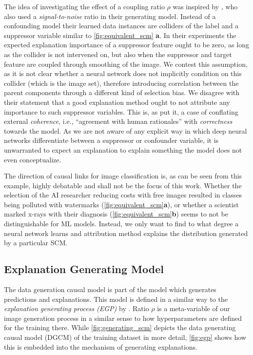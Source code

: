 The idea of investigating the effect of a coupling ratio $\rho$ was inspired by \citet{Clark2023}, who also used a \textit{signal-to-noise} ratio in their generating model. Instead of a confounding model their learned data instances are colliders of the label and a suppressor variable similar to \cref{fig:equivalent_scm} \textbf{a}. In their experiments the expected explanation importance of a suppressor feature ought to be zero, as long as the collider is not intervened on, but also when the suppressor and target feature are coupled through smoothing of the image. We contest this assumption, as it is not clear whether a neural network does not implicitly condition on this collider (which is the image set), therefore introducing correlation between the parent components through a different kind of selection bias. We disagree with their statement that a good explanation method ought to not attribute any importance to such suppressor variables. This is, as  \citet{Nauta2023} put it, a case of conflating external \textit{coherence}, i.e., ``agreement with human rationales'' \citep{Atanasova2020} with \textit{correctness} towards the model. As we are not aware of any explicit way in which deep neural networks differentiate between a suppressor or confounder variable, it is unwarranted to expect an explanation to explain something the model does not even conceptualize. 

The direction of causal links for image classification is, as can be seen from this example, highly debatable and shall not be the focus of this work. Whether the selection of the AI researcher reducing costs with free images resulted in classes being polluted with watermarks (\cref{fig:equivalent_scm}\textbf{a}), or whether a scientist marked x-rays with their diagnosis (\cref{fig:equivalent_scm}\textbf{b}) seems to not be distinguishable for ML models. 
Instead, we only want to find to what degree a neural network learns and attribution method explains the distribution generated by a particular SCM.

\subsection{Explanation Generating Model}
The data generation causal model is part of the model which generates predictions and explanations.
This model is defined in a similar way to the \textit{explanation generating process (EGP)} by \citet{Karimi2023}.
Ratio $\rho$ is a meta-variable of our image generation process in a similar sense to how hyperparameters are defined for the training there. While \cref{fig:generating_scm} depicts the data generating causal model (DGCM) of the training dataset in more detail, \cref{fig:egp} shows how this is embedded into the mechanism of generating explanations. 

